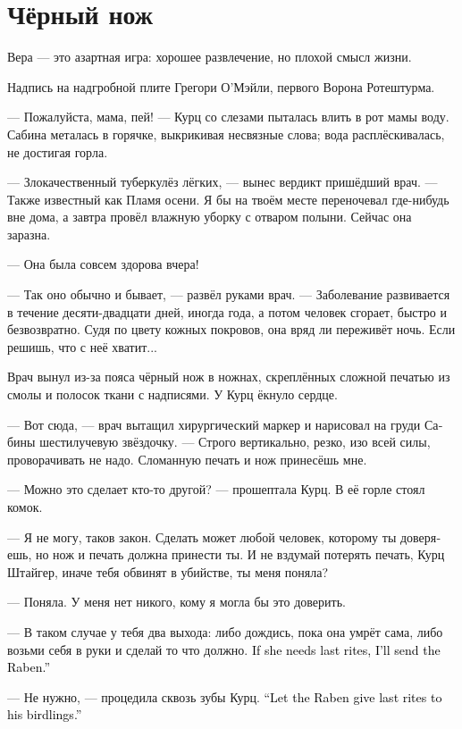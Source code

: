 \documentclass[a4paper,12pt,fleqn]{book}\usepackage{cooltooltips}\usepackage{polyglossia}\setdefaultlanguage[babelshorthands=true]{russian}\setotherlanguage{english}\defaultfontfeatures{Ligatures=TeX,Mapping=tex-text} \usepackage{xcolor}\definecolor{lightgray}{HTML}{bbbbbb}\color{lightgray}\newcommand{\ml}[3]{\textenglish{\textcolor{black}{#3}}}
\begin{document}
\section{Чёрный нож}

\epigraph
{Вера --- это азартная игра: хорошее развлечение, но плохой смысл жизни.}
{Надпись на надгробной плите Грегори О'Мэйли, первого Ворона Ротештурма.}

--- Пожалуйста, мама, пей! --- Курц со слезами пыталась влить в рот мамы воду.
Сабина металась в горячке, выкрикивая несвязные слова;
вода расплёскивалась, не достигая горла.

--- Злокачественный туберкулёз лёгких, --- вынес вердикт пришёдший врач.
--- Также известный как Пламя осени.
Я бы на твоём месте переночевал где-нибудь вне дома, а завтра провёл влажную уборку с отваром полыни.
Сейчас она заразна.

--- Она была совсем здорова вчера!

--- Так оно обычно и бывает, --- развёл руками врач.
--- Заболевание развивается в течение десяти-двадцати дней, иногда года, а потом человек сгорает, быстро и безвозвратно.
Судя по цвету кожных покровов, она вряд ли переживёт ночь.
Если решишь, что с неё хватит...

Врач вынул из-за пояса чёрный нож в ножнах, скреплённых сложной печатью из смолы и полосок ткани с надписями.
У Курц ёкнуло сердце.

--- Вот сюда, --- врач вытащил хирургический маркер и нарисовал на груди Сабины шестилучевую звёздочку.
--- Строго вертикально, резко, изо всей силы, проворачивать не надо.
Сломанную печать и нож принесёшь мне.

--- Можно это сделает кто-то другой? --- прошептала Курц.
В её горле стоял комок.

--- Я не могу, таков закон.
Сделать может любой человек, которому ты доверяешь, но нож и печать должна принести ты.
И не вздумай потерять печать, Курц Штайгер, иначе тебя обвинят в убийстве, ты меня поняла?

--- Поняла.
У меня нет никого, кому я могла бы это доверить.

--- В таком случае у тебя два выхода: либо дождись, пока она умрёт сама, либо возьми себя в руки и сделай то что должно.
\ml{$0$}
{Если нужно отпеть --- я могу прислать Ворона.}
{If she needs last rites, I'll send the Raben.''}

--- Не нужно, --- процедила сквозь зубы Курц.
\ml{$0$}
{--- Пусть Ворон своих птенцов отпевает.}
{``Let the Raben give last rites to his birdlings.''}
\end{document}
